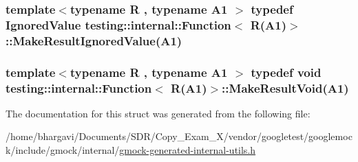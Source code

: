 \subsubsection[{\texorpdfstring{Make\+Result\+Ignored\+Value}{MakeResultIgnoredValue}}]{\setlength{\rightskip}{0pt plus 5cm}template$<$typename R , typename A1 $>$ typedef {\bf Ignored\+Value} {\bf testing\+::internal\+::\+Function}$<$ R(A1)$>$\+::Make\+Result\+Ignored\+Value(A1)}\hypertarget{structtesting_1_1internal_1_1_function_3_01_r_07_a1_08_4_a8fa56b9e05cb029ec7c8415ee352f865}{}\label{structtesting_1_1internal_1_1_function_3_01_r_07_a1_08_4_a8fa56b9e05cb029ec7c8415ee352f865}
\subsubsection[{\texorpdfstring{Make\+Result\+Void}{MakeResultVoid}}]{\setlength{\rightskip}{0pt plus 5cm}template$<$typename R , typename A1 $>$ typedef void {\bf testing\+::internal\+::\+Function}$<$ R(A1)$>$\+::Make\+Result\+Void(A1)}\hypertarget{structtesting_1_1internal_1_1_function_3_01_r_07_a1_08_4_aab10495172953eb51fc3940c4c1e890a}{}\label{structtesting_1_1internal_1_1_function_3_01_r_07_a1_08_4_aab10495172953eb51fc3940c4c1e890a}


The documentation for this struct was generated from the following file\+:\begin{DoxyCompactItemize}
\item 
/home/bhargavi/\+Documents/\+S\+D\+R/\+Copy\+\_\+\+Exam\+\_\+X/vendor/googletest/googlemock/include/gmock/internal/\hyperlink{gmock-generated-internal-utils_8h}{gmock-\/generated-\/internal-\/utils.\+h}\end{DoxyCompactItemize}
